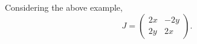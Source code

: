 \begin{example}
Considering the above example, 
\[J=\begin{pmatrix}
2x&-2y\\
2y&2x
\end{pmatrix}.\]
\end{example}



\begin{comment}
\begin{definition}[Derivative]
The \vocab{derivative} of $f(z)$ at $z=a$ is given by the limit
\[f^\prime(a)=\lim_{z\to a}\frac{f(z)-f(a)}{z-a}.\]
\end{definition}

\subsection{Analytic Functions}
The class of \vocab{analytic functions} is formed by the complex functions of a complex variable which possess a derivative wherever the function is defined.

The definition of the derivative can be rewritten in the form
\[f^\prime(z)=\lim_{h\to0}\frac{f(z+h)-f(z)}{h}.\]
\begin{lemma}[Differentiability implies continuity]
$f(z)$ is continuous if it is analytic.
\end{lemma}

\begin{proof}
From $\displaystyle f(z+h)-f(z)=h\cdot\frac{f(z+h)-f(z)}{h}$ we obtain
\[\lim_{h\to0}\sqbrac{f(z+h)-f(z)}=0\cdot f^\prime(z)=0.\]
\end{proof}

If we write $f(z)=u(z)+iv(z)$ it follows that $u(z)$ and $v(z)$ are both continuous.

The limit of the difference quotient must be the same regardless of the way in which $h$ approaches zero. If we choose real values for $h$, then the imaginary part $y$ is kept constant, and the derivative becomes a partial derivative with respect to $x$. We have thus
\[f^\prime(z)=\pdv{f}{x}=\pdv{u}{x}+i\pdv{v}{x}.\]
Similarly, if we substitute purely imaginary values $ik$ for $h$, we obtain 
\[f^\prime(z)=\lim_{k\to0}\frac{f(z+ik)-f(z)}{ik}=-i\pdv{f}{y}=-i\pdv{u}{y}+\pdv{v}{y}.\]
It follows that $f(z)$ must satisfy the partial differential equation
\[\pdv{f}{x}=-i\pdv{f}{y}\]
which resolves into the real equations
\begin{equation}\label{eqn:cauchy-riemann}
\pdv{u}{x}=\pdv{v}{y},\quad\pdv{u}{y}=-\pdv{v}{x}.
\end{equation}
These are the \vocab{Cauchy--Riemann equations} which must be satisfied by the real and imaginary part of any analytic function.


\end{comment}
